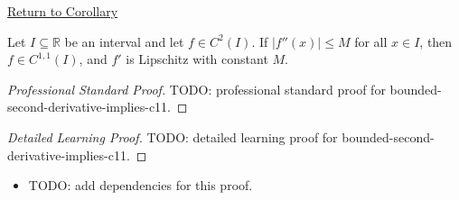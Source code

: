 \newpage
{}
\label{prf:bounded-second-derivative-implies-c11}

\begin{remark*}[Return]
\hyperref[cor:bounded-second-derivative-implies-c11]{Return to Corollary}
\end{remark*}

\begin{corollary*}
Let \(I\subseteq\mathbb{R}\) be an interval and let \(f\in C^2(I)\). If
\(|f''(x)|\leq M\) for all \(x\in I\), then \(f\in C^{1,1}(I)\), and \(f'\)
is Lipschitz with constant \(M\).
\end{corollary*}

\begin{proof}[Professional Standard Proof]
\LRAProofBodyStart
TODO: professional standard proof for bounded-second-derivative-implies-c11.
\end{proof}

\begin{proof}[Detailed Learning Proof]
\LRAProofBodyStart
TODO: detailed learning proof for bounded-second-derivative-implies-c11.
\end{proof}

\begin{remark*}
\end{remark*}

\begin{dependencies}
\begin{itemize}
  \item TODO: add dependencies for this proof.
\end{itemize}
\end{dependencies}

\clearpage
